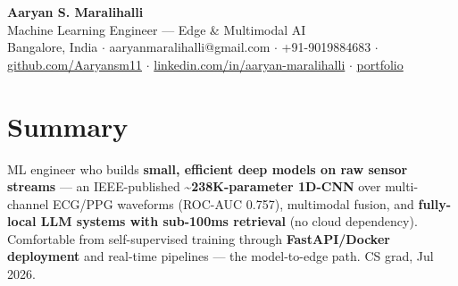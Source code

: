 \documentclass[10pt,a4paper]{article}
\begin{document}
\vspace*{-1cm}
\begin{center}
{\LARGE\bfseries Aaryan S. Maralihalli}\\[0.5em]
{\large Machine Learning Engineer --- Edge \& Multimodal AI}\\[0.3em]
Bangalore, India $\cdot$ aaryanmaralihalli@gmail.com $\cdot$ +91-9019884683 $\cdot$ \href{https://github.com/Aaryansm11}{github.com/Aaryansm11} $\cdot$ \href{https://linkedin.com/in/aaryan-maralihalli}{linkedin.com/in/aaryan-maralihalli} $\cdot$ \href{https://portfolio-zeta-ten-85.vercel.app}{portfolio}
\end{center}\vspace{0.4ex}
\section*{Summary}
ML engineer who builds \textbf{small, efficient deep models on raw sensor streams} --- an IEEE-published \textbf{\textasciitilde{}238K-parameter 1D-CNN} over multi-channel ECG/PPG waveforms (ROC-AUC 0.757), multimodal fusion, and \textbf{fully-local LLM systems with sub-100ms retrieval} (no cloud dependency). Comfortable from self-supervised training through \textbf{FastAPI/Docker deployment} and real-time pipelines --- the model-to-edge path. CS grad, Jul 2026.\par\vspace{2pt}
\end{document}
